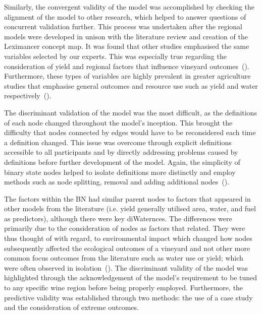 \documentclass[10pt,letterpaper]{article}
\begin{document}
Similarly, the convergent validity of the model was accomplished by checking the alignment of the model to other research, which helped to answer questions of concurrent validation further. This process was undertaken after the regional models were developed in unison with the literature review and creation of the Leximancer concept map. It was found that other studies emphasised the same variables selected by our experts. This was especially true regarding the consideration of yield and regional factors that influence vineyard outcomes~(\cite{abbalDecisionSupportSystem2016,campsGrapeHarvestYield2012,hallWithinseasonTemporalVariation2011}). Furthermore, these types of variables are highly prevalent in greater agriculture studies that emphasise general outcomes and resource use such as yield and water respectively~(\cite{heFruitYieldPrediction2022,laurentLocalInfluenceClimate2022}).

The discriminant validation of the model was the most difficult, as the definitions of each node changed throughout the model's inception. This brought the difficulty that nodes connected by edges would have to be reconsidered each time a definition changed. This issue was overcome through explicit definitions accessible to all participants and by directly addressing problems caused by definitions before further development of the model. Again, the simplicity of binary state nodes helped to isolate definitions more distinctly and employ methods such as node splitting, removal and adding additional nodes~(\cite{korbBayesianArtificialIntelligence2011}).

The factors within the BN had similar parent nodes to factors that appeared in other models from the literature (i.e. yield generally utilised area, water, and fuel as predictors), although there were key diWaternces. The differences were primarily due to the consideration of nodes as factors that related. They were thus thought of with regard, to environmental impact which changed how nodes subsequently affected the ecological outcomes of a vineyard and not other more common focus outcomes from the literature such as water use or yield; which were often observed in isolation~(\cite{laurentReviewIssuesMethods2021}). The discriminant validity of the model was highlighted through the acknowledgement of the model's requirement to be tuned to any specific wine region before being properly employed. Furthermore, the predictive validity was established through two methods: the use of a case study and the consideration of extreme outcomes.
\end{document}
